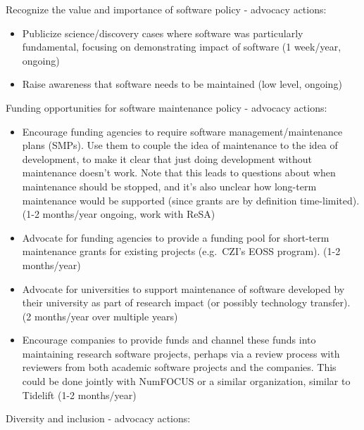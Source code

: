 \documentclass[
]{book}
\begin{document}
Recognize the value and importance of software policy - advocacy actions:

\begin{itemize}
\item
  Publicize science/discovery cases where software was particularly fundamental, focusing on
  demonstrating impact of software (1 week/year, ongoing)
\item
  Raise awareness that software needs to be maintained (low level, ongoing)
\end{itemize}

Funding opportunities for software maintenance policy - advocacy actions:

\begin{itemize}
\item
  Encourage funding agencies to require software management/maintenance plans (SMPs).
  Use them to couple the idea of maintenance to the idea of development, to make it clear
  that just doing development without maintenance doesn't work. Note that this leads to
  questions about when maintenance should be stopped, and it's also unclear how long-term
  maintenance would be supported (since grants are by definition time-limited).
  (1-2 months/year ongoing, work with ReSA)
\item
  Advocate for funding agencies to provide a funding pool for short-term maintenance grants
  for existing projects (e.g.~CZI's EOSS program). (1-2 months/year)
\item
  Advocate for universities to support maintenance of software developed by their university
  as part of research impact (or possibly technology transfer). (2 months/year over multiple years)
\item
  Encourage companies to provide funds and channel these funds into maintaining research
  software projects, perhaps via a review process with reviewers from both academic software
  projects and the companies. This could be done jointly with NumFOCUS or a similar organization,
  similar to Tidelift (1-2 months/year)
\end{itemize}

Diversity and inclusion - advocacy actions:
\end{document}
